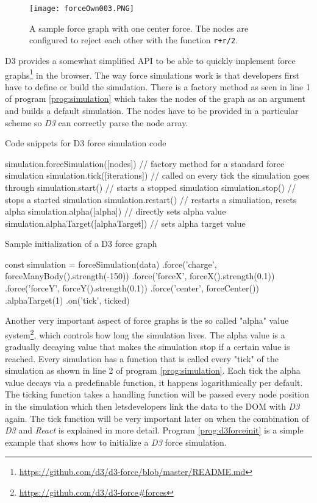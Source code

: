 \begin{figure}
  \centering
  \texttt{[image: forceOwn003.PNG]}
  \caption{A sample force graph with one center force. The nodes are configured to reject each other with the function \texttt{r+r/2}.}
  \label{fig:force004}
\end{figure}

D3 provides a somewhat simplified API to be able to quickly implement force graphs\footnote{\url{https://github.com/d3/d3-force/blob/master/README.md}} in the browser. The way force simulations work is that developers first have to define or build the simulation. There is a factory method as seen in line 1 of program \ref{prog:simulation} which takes the nodes of the graph as an argument and builds a default simulation. The nodes have to be provided in a particular scheme so \emph{D3} can correctly parse the node array. 

\begin{program}
\caption{Code snippets for D3 force simulation code}
\label{prog:simulation}
\begin{JsCode}
simulation.forceSimulation([nodes]) // factory method for a standard force simulation
simulation.tick([iterations]) // called on every tick the simulation goes through
simulation.start() // starts a stopped simulation
simulation.stop() // stops a started simulation
simulation.restart() // restarts a simuliation, resets alpha
simulation.alpha([alpha]) // directly sets alpha value
simulation.alphaTarget([alphaTarget]) // sets alpha target value
\end{JsCode}
\end{program}

\begin{program}
\caption{Sample initialization of a D3 force graph}
\label{prog:d3forceinit}
\begin{JsCode}
const simulation = forceSimulation(data)
  .force('charge', forceManyBody().strength(-150))
  .force('forceX', forceX().strength(0.1))
  .force('forceY', forceY().strength(0.1))
  .force('center', forceCenter())
  .alphaTarget(1)
  .on('tick', ticked)
\end{JsCode}
\end{program}

Another very important aspect of force graphs is the so called "alpha" value system\footnote{\url{https://github.com/d3/d3-force\#forces}}, which controls how long the simulation lives. The alpha value is a gradually decaying value that makes the simulation stop if a certain value is reached. Every simulation has a function that is called every "tick" of the simulation as shown in line 2 of program \ref{prog:simulation}. Each tick the alpha value decays via a predefinable function, it happens logarithmically per default. The ticking function takes a handling function will be passed every node position in the simulation which then letsdevelopers link the data to the DOM with \emph{D3} again. The tick function will be very important later on when the combination of \emph{D3} and \emph{React} is explained in more detail. Program \ref{prog:d3forceinit} is a simple example that shows how to initialize a \emph{D3} force simulation.

